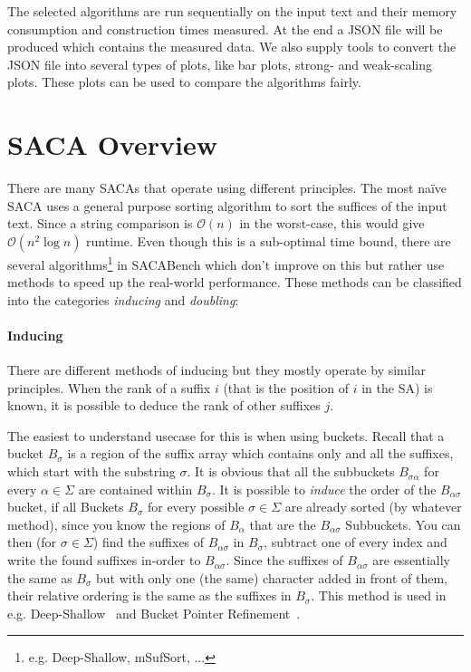 The selected algorithms are run sequentially on the input text and their memory consumption
and construction times measured.
At the end a JSON file will be produced which contains the measured data.
We also supply tools to convert the JSON file into several types of plots, like bar plots, strong- and weak-scaling plots.
These plots can be used to compare the algorithms fairly.

\section{SACA Overview}

There are many SACAs that operate using different principles.
The most na\"ive SACA uses a general purpose sorting algorithm to sort the suffices of the input text.
Since a string comparison is $\mathcal O (n)$ in the worst-case, this would give $\mathcal O (n^2 \log n)$ runtime.
Even though this is a sub-optimal time bound,
there are several algorithms\footnote{e.g. Deep-Shallow, mSufSort, ...} in SACABench which don't improve on this
but rather use methods to speed up the real-world performance.
These methods can be classified into the categories \emph{inducing} and \emph{doubling}:
%
\paragraph{Inducing} %
There are different methods of inducing but they mostly operate by similar principles.
When the rank of a suffix $i$ (that is the position of $i$ in the SA) is known,
it is possible to deduce the rank of other suffixes $j$.

The easiest to understand usecase for this is when using buckets.
Recall that a bucket $B_{\sigma}$ is a region of the suffix
array which contains only and all the suffixes,
which start with the substring $\sigma$.
It is obvious that all the subbuckets $B_{\sigma\alpha}$ for
every $\alpha \in \Sigma$ are contained within $B_\sigma$.
It is possible to \emph{induce} the order of the $B_{\alpha\sigma}$ bucket,
if all Buckets $B_\sigma$ for every possible $\sigma \in \Sigma$ are already sorted (by whatever method),
since you know the regions of $B_\alpha$ that are the $B_{\alpha\sigma}$ Subbuckets.
You can then (for $\sigma \in \Sigma$) find the suffixes of $B_{\alpha\sigma}$ in $B_{\sigma}$,
subtract one of every index and write the found suffixes in-order to $B_{\alpha\sigma}$.
Since the suffixes of $B_{\alpha\sigma}$ are essentially the same as $B_\sigma$ but
with only one (the same) character added in front of them,
their relative ordering is the same as the suffixes in $B_\sigma$.
This method is used in e.g. Deep-Shallow~\cite{saca:4} and 
Bucket Pointer Refinement~\cite{saca:2}.

